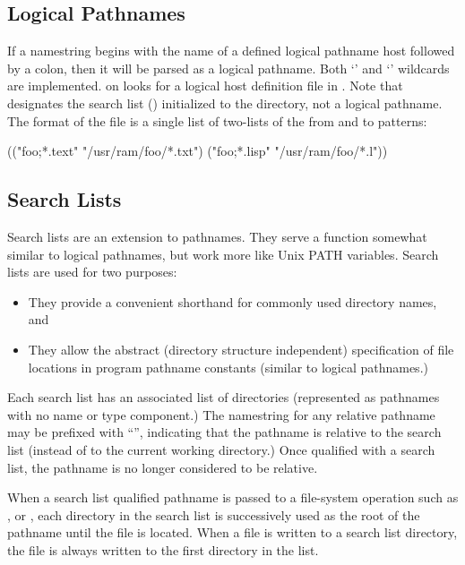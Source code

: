 \subsection{Logical Pathnames}
\label{logical-pathnames}

If a namestring begins with the name of a defined logical pathname
host followed by a colon, then it will be parsed as a logical
pathname.  Both `\code{*}' and `\code{**}' wildcards are implemented.
 on  looks for a
logical host definition file in
. Note that 
designates the search list () initialized to the
\cmucl{}  directory, not a logical pathname.  The format of
the file is a single list of two-lists of the from and to patterns:

\begin{example}
(("foo;*.text" "/usr/ram/foo/*.txt")
 ("foo;*.lisp" "/usr/ram/foo/*.l"))
\end{example}


\subsection{Search Lists}
\label{search-lists}

Search lists are an extension to \clisp{} pathnames.  They serve a function
somewhat similar to \clisp{} logical pathnames, but work more like Unix PATH
variables.  Search lists are used for two purposes:
\begin{itemize}
\item They provide a convenient shorthand for commonly used directory names,
and

\item They allow the abstract (directory structure independent) specification
of file locations in program pathname constants (similar to logical pathnames.)
\end{itemize}
Each search list has an associated list of directories (represented as
pathnames with no name or type component.)  The namestring for any relative
pathname may be prefixed with ``\code{:}'', indicating that the
pathname is relative to the search list  (instead of to the current
working directory.)  Once qualified with a search list, the pathname is no
longer considered to be relative.

When a search list qualified pathname is passed to a file-system operation such
as ,  or , each directory in the search
list is successively used as the root of the pathname until the file is
located.  When a file is written to a search list directory, the file is always
written to the first directory in the list.


